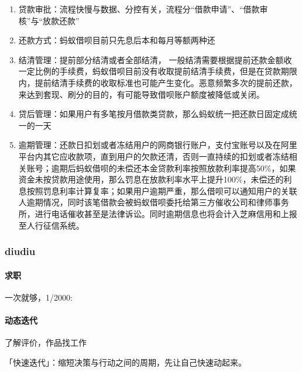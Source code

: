 \documentclass[letterpaper,11pt,english]{sphinxmanual}
\begin{document}
\begin{enumerate}
\item {} 
贷款审批：流程快慢与数据、分控有关，流程分“借款申请”、“借款审核”与“放款还款”

\item {} 
还款方式：蚂蚁借呗目前只先息后本和每月等额两种还

\item {} 
结清管理：提前部分结清或者全部结清，
一般结清需要根据提前还款金额收一定比例的手续费，蚂蚁借呗目前没有收取提前结清手续费，但是在贷款期限内，提前结清手续费的收取标准也可能产生变化。恶意频繁多次的提前还款，来达到套现、刷分的目的，有可能导致借呗账户额度被降低或关闭。

\item {} 
贷后管理：如果用户有多笔按月借款类贷款，那么蚂蚁统一把还款日固定成统一的一天

\item {} 
逾期管理：还款日扣划或者冻结用户的网商银行账户，支付宝账号以及在阿里平台内其它应收款项，直到用户的欠款还清，否则一直持续的扣划或者冻结相关账号；逾期后蚂蚁借呗的未偿还本金贷款利率按照放款利率提高50\%，如果资金未按贷款用途使用，那么罚息在放款利率水平上提升100\%，未偿还的利息按照罚息利率计算复率；如果用户逾期严重，那么借呗可以通知用户的关联人逾期情况，同时该笔借款会被蚂蚁借呗委托给第三方催收公司和律师事务所，进行电话催收甚至是法律诉讼。同时逾期信息也将会计入芝麻信用和上报至人行征信系统。

\end{enumerate}


\subsubsection{diudiu}
\label{\detokenize{chapter_experience/diudiu:diudiu}}\label{\detokenize{chapter_experience/diudiu::doc}}

\paragraph{求职}
\label{\detokenize{chapter_experience/diudiu:id1}}
一次就够，1/2000:


\paragraph{动态迭代}
\label{\detokenize{chapter_experience/diudiu:id2}}
了解评价，作品找工作

「快速迭代」：缩短决策与行动之间的周期，先让自己快速动起来。%
\begin{footnote}[213]\sphinxAtStartFootnote
{}
%
\end{footnote}
\end{document}
